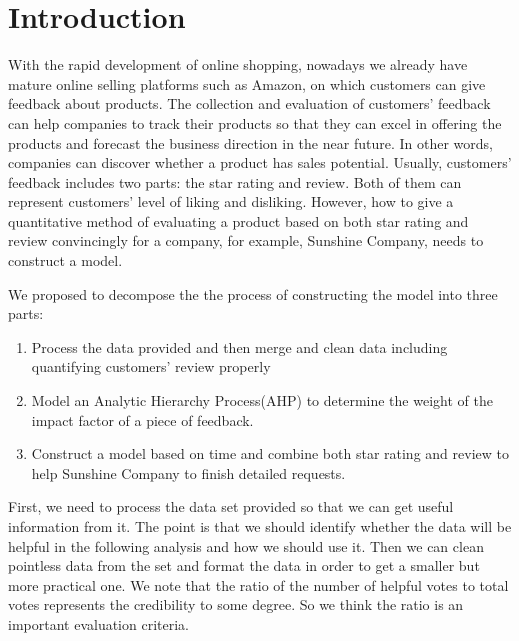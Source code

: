 \documentclass{mcmthesis}
\begin{document}

\section{Introduction}
With the rapid development of online shopping, nowadays we already have mature online selling platforms such as Amazon, on which customers can give feedback about products. The collection and evaluation of customers’ feedback can help companies to track their products so that they can excel in offering the products and forecast the business direction in the near future. In other words, companies can discover whether a product has sales potential. Usually, customers’ feedback includes two parts: the star rating and review. Both of them can represent customers’ level of liking and disliking. However, how to give a quantitative method of evaluating a product based on both star rating and review convincingly for a company, for example, Sunshine Company, needs to construct a model. 

We proposed to decompose the the process of constructing the model into three parts:
\begin{enumerate}
    \item Process the data provided and then merge and clean data including quantifying customers' review properly
    
    \item Model an Analytic Hierarchy Process(AHP) to determine the weight of the impact factor of a piece of feedback. 
    
    \item Construct a model based on time and combine both star rating and review to help Sunshine Company to finish detailed requests.
\end{enumerate}
 
First, we need to process the data set provided so that we can get useful information from it. The point is that we should identify whether the data will be helpful in the following analysis and how we should use it. Then we can clean pointless data from the set and format the data in order to get a smaller but more practical one. We note that the ratio of the number of helpful votes to total votes represents the credibility to some degree. So we think the ratio is an important evaluation criteria. 
\end{document}

